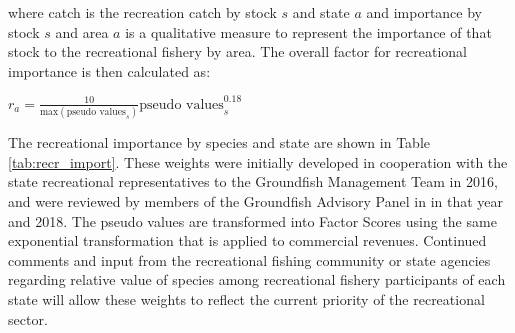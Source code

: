 \documentclass[12pt,]{article}
\begin{document}
where catch is the recreation catch by stock \(s\) and state \(a\) and
importance by stock \(s\) and area \(a\) is a qualitative measure to
represent the importance of that stock to the recreational fishery by
area. The overall factor for recreational importance is then calculated
as:

\begin{centering}

$r_a = \frac{10}{\text{max}(\text{pseudo values}_s)}\text{pseudo values}_s^{0.18}$
  
  \end{centering}

The recreational importance by species and state are shown in Table
\ref{tab:recr_import}. These weights were initially developed in
cooperation with the state recreational representatives to the
Groundfish Management Team in 2016, and were reviewed by members of the
Groundfish Advisory Panel in in that year and 2018. The pseudo values
are transformed into Factor Scores using the same exponential
transformation that is applied to commercial revenues. Continued
comments and input from the recreational fishing community or state
agencies regarding relative value of species among recreational fishery
participants of each state will allow these weights to reflect the
current priority of the recreational sector.
\end{document}
